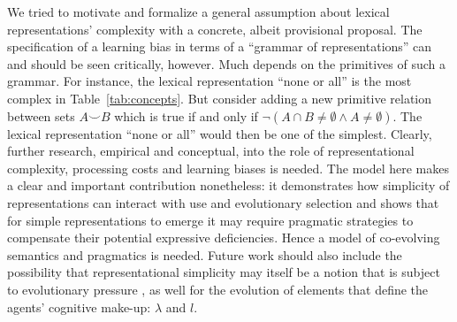\documentclass[a4paper, 11pt]{article}
\theoremstyle{Satz}
\begin{document}

We tried to motivate and formalize a general assumption about lexical representations'
complexity with a concrete, albeit provisional proposal. The specification of a learning bias
in terms of a ``grammar of representations'' can and should be seen critically, however. Much
depends on the primitives of such a grammar. For instance, the lexical representation ``none or
all'' is the most complex in Table~\ref{tab:concepts}. But consider adding a new primitive
relation between sets $A \smile B$ which is true if and only if
$\neg(A \cap B \neq \emptyset \wedge A \neq \emptyset)$. The lexical representation ``none or
all'' would then be one of the simplest. Clearly, further research, empirical and conceptual,
into the role of representational complexity, processing costs and learning biases is
needed. The model here makes a clear and important contribution nonetheless: it demonstrates
how simplicity of representations can interact with use and evolutionary selection and shows
that for simple representations to emerge it may require pragmatic strategies to compensate
their potential expressive deficiencies. Hence a model of co-evolving semantics and pragmatics
is needed. Future work should also include the possibility that representational simplicity may
itself be a notion that is subject to evolutionary pressure
\citep[cf.][]{ThompsonKirby2016:Culture-Shapes-}, as well for the evolution of elements that
define the agents' cognitive make-up: $\lambda$ and $l$.
\end{document}
